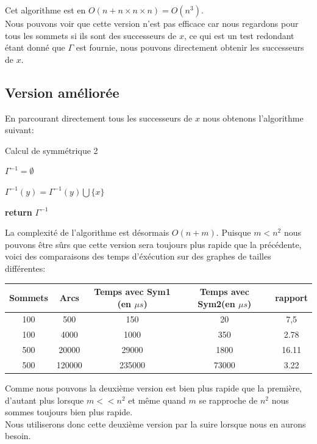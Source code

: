 \documentclass{article}
\begin{document}
Cet algorithme est en $O(n + n\times n \times n) = O(n^3)$.\\
Nous pouvons voir que cette version n'est pas efficace car nous regardons pour tous les sommets si
ils sont des successeurs de $x$, ce qui est un test redondant étant donné que $\Gamma$ est fournie,
nous pouvons directement obtenir les successeurs de $x$.

\subsection{Version améliorée}

En parcourant directement tous les successeurs de $x$ nous obtenons l'algorithme suivant:

\begin{algorithm}
\caption{Calcul de symmétrique 2}\label{sym2}
\begin{algorithmic}[1]
	
		\State $\Gamma^{-1} = \emptyset$
	\EndFor
		
			\State $\Gamma^{-1}(y) = \Gamma^{-1}(y) \bigcup \{x\}$
		\EndFor
	\EndFor
	
		\State \textbf{return} $\Gamma^{-1}$
\EndProcedure
\end{algorithmic}
\end{algorithm}

La complexité de l'algorithme est désormais $O(n + m)$. Puisque $m < n^2$ nous pouvons être sûrs que 
cette version sera toujours plus rapide que la précédente, voici des comparaisons des temps d'éxécution
sur des graphes de tailles différentes:\\


\begin{center}
\begin{tabular}{| c | c | c | c | c |}
	\hline
	 Sommets & Arcs & Temps avec Sym1 (en $\mu s$)& Temps avec Sym2(en $\mu s$) & rapport \\ \hline
	 100 & 500 & 150 & 20 & 7,5 \\ \hline
	 100 & 4000 & 1000 & 350 & 2.78\\ \hline
	 500 & 20000 & 29000 & 1800 & 16.11 \\ \hline
	 500 & 120000 & 235000 & 73000 & 3.22 \\ \hline
\end{tabular}
\end{center}

Comme nous pouvons la deuxième version est bien plus rapide que la première, d'autant plus lorsque
$m << n^2$ et même quand $m$ se rapproche de $n^2$ nous sommes toujours bien plus rapide.\\
Nous utiliserons donc cette deuxième version par la suire lorsque nous en aurons besoin.
\end{document}
